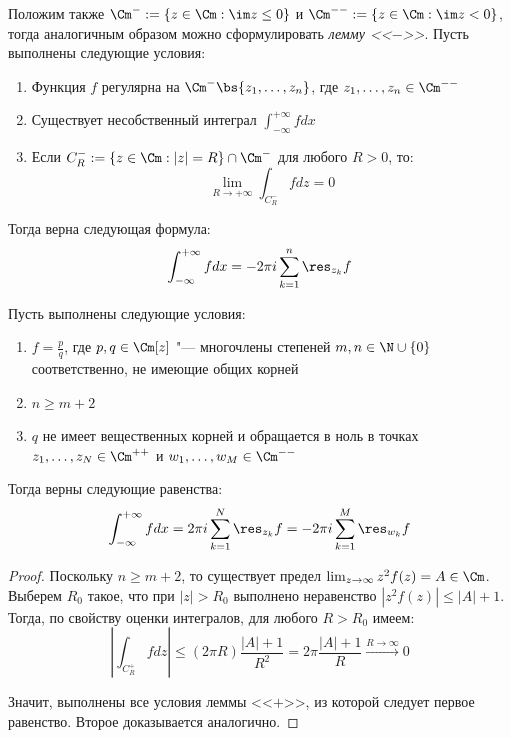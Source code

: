 \begin{note}
	Положим также $\Cm^- := \{z \in \Cm: \im z \le 0\}$ и $\Cm^{--} := \{z \in \Cm: \im z < 0\}$, тогда аналогичным образом можно сформулировать \textit{лемму <<$-$>>}. Пусть выполнены следующие условия:
	\begin{enumerate}
		\item Функция $f$ регулярна на $\Cm^- \bs \{z_1, \dotsc, z_n\}$, где $z_1, \dotsc, z_n \in \Cm^{--}$
		\item Существует несобственный интеграл $\int_{-\infty}^{+\infty}fdx$
		\item Если $C_R^- := \{z \in \Cm: |z| = R\} \cap \Cm^-$ для любого $R > 0$, то:
		\[\lim_{R\to +\infty} \int_{C_R^-}fdz = 0\]
	\end{enumerate}
	
	Тогда верна следующая формула:
	\[\int_{-\infty}^{+\infty}fdx = -2\pi i\sum_{k = 1}^n\res_{z_k}{f}\]
\end{note}

\begin{theorem}
	Пусть выполнены следующие условия:
	\begin{enumerate}
		\item $f = \frac pq$, где $p, q \in \Cm[z]$ "--- многочлены степеней $m, n \in \N \cup \{0\}$ соответственно, не имеющие общих корней
		\item $n \ge m + 2$
		\item $q$ не имеет вещественных корней и обращается в ноль в точках $z_1, \dotsc, z_N \in \Cm^{++}$ и $w_1, \dotsc, w_M \in \Cm^{--}$
	\end{enumerate}
	
	Тогда верны следующие равенства:
	\[\int_{-\infty}^{+\infty}fdx = 2\pi i\sum_{k=1}^N \res_{z_k}f = -2\pi i\sum_{k=1}^M \res_{w_k}f\]
\end{theorem}

\begin{proof}
	Поскольку $n \ge m + 2$, то существует предел $\lim_{z \to \infty}z^2f(z) = A \in \Cm$. Выберем $R_0$ такое, что при $|z| > R_0$ выполнено неравенство $|z^2f(z)| \le |A| + 1$. Тогда, по свойству оценки интегралов, для любого $R > R_0$ имеем:
	\[\left|\int_{C_R^+}fdz\right| \le (2\pi R)\frac{|A| + 1}{R^2} = 2\pi\frac{|A| + 1}{R} \xrightarrow{R \to \infty} 0\]
	
	Значит, выполнены все условия леммы <<$+$>>, из которой следует первое равенство. Второе доказывается аналогично.
\end{proof}

